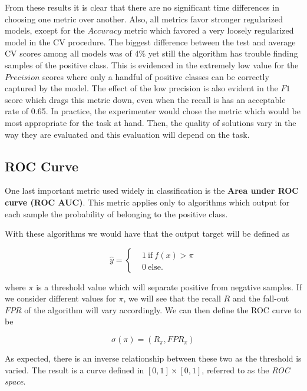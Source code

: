 From these results it is clear that there are no significant time differences in choosing one metric over another.
Also, all metrics favor stronger regularized models, except for the $Accuracy$ metric which favored a very loosely regularized model in the CV procedure.
The biggest difference between the test and average CV scores among all models was of 4\% yet still the algorithm has trouble finding samples of the positive class.
This is evidenced in the extremely low value for the $Precision$ scores where only a handful of positive classes can be correctly captured by the model.
The effect of the low precision is also evident in the $F1$ score which drags this metric down, even when the recall is has an acceptable rate of 0.65.
In practice, the experimenter would chose the metric which would be most appropriate for the task at hand.
Then, the quality of solutions vary in the way they are evaluated and this evaluation will depend on the task.


\subsection{ROC Curve}

One last important metric used widely in classification is the \textbf{Area under ROC curve (ROC AUC)}.
This metric applies only to algorithms which output for each sample the probability of belonging to the positive class.

With these algorithms we would have that the output target will be defined as

\begin{equation}
\hat{y} =
\begin{cases}
&1 \ \mbox{if} \ f(x) > \pi \\
&0 \ \mbox{else}.
\end{cases}
\end{equation}

where $\pi$ is a threshold value which will separate positive from negative samples.
If we consider different values for $\pi$, we will see that the recall $R$ and the fall-out $FPR$ of the algorithm will vary accordingly.
We can then define the ROC curve to be

\begin{equation}
\sigma(\pi) = (R_\pi, FPR_\pi)
\end{equation}

As expected, there is an inverse relationship between these two as the threshold is varied.
The result is a curve defined in $[0,1]\times[0,1]$, referred to as the \textit{ROC space}.

